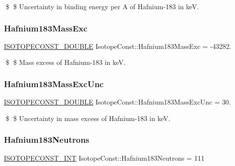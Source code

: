 \$ \$ Uncertainty in binding energy per A of Hafnium-\/183 in keV. \mbox{\label{group___isotope_const-_hafnium-_hf183_ga64b0e600d5e19cb06a7758327fc78f4d}} 
\subsubsection{\texorpdfstring{Hafnium183\+Mass\+Exc}{Hafnium183MassExc}}
{\footnotesize\ttfamily \mbox{\hyperlink{group___isotope_const-_macros_ga8f45a7272ce02c0b4c65c44636ed719a}{I\+S\+O\+T\+O\+P\+E\+C\+O\+N\+S\+T\+\_\+\+D\+O\+U\+B\+LE}} Isotope\+Const\+::\+Hafnium183\+Mass\+Exc = -\/43282.}

\$ \$ Mass excess of Hafnium-\/183 in keV. \mbox{\label{group___isotope_const-_hafnium-_hf183_ga336be5e631040ed662168ffa95ceb25b}} 
\subsubsection{\texorpdfstring{Hafnium183\+Mass\+Exc\+Unc}{Hafnium183MassExcUnc}}
{\footnotesize\ttfamily \mbox{\hyperlink{group___isotope_const-_macros_ga8f45a7272ce02c0b4c65c44636ed719a}{I\+S\+O\+T\+O\+P\+E\+C\+O\+N\+S\+T\+\_\+\+D\+O\+U\+B\+LE}} Isotope\+Const\+::\+Hafnium183\+Mass\+Exc\+Unc = 30.}

\$ \$ Uncertainty in mass excess of Hafnium-\/183 in keV. \mbox{\label{group___isotope_const-_hafnium-_hf183_gaa370b5322bfa941c31ff3f50ebccbbd7}} 
\subsubsection{\texorpdfstring{Hafnium183\+Neutrons}{Hafnium183Neutrons}}
{\footnotesize\ttfamily \mbox{\hyperlink{group___isotope_const-_macros_ga5f18360b3e99483a35c32d789e62621c}{I\+S\+O\+T\+O\+P\+E\+C\+O\+N\+S\+T\+\_\+\+I\+NT}} Isotope\+Const\+::\+Hafnium183\+Neutrons = 111}

